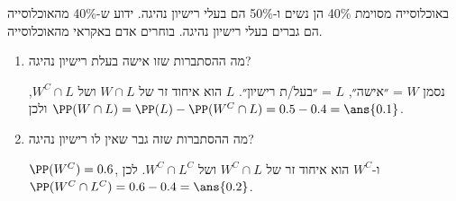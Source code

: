 באוכלוסייה מסוימת 40\% הן נשים ו-50\% הם בעלי רישיון נהיגה. ידוע ש-40\% מהאוכלוסייה הם גברים בעלי רישיון נהיגה. בוחרים אדם באקראי מהאוכלוסייה.
\begin{enumerate}
\item מה ההסתברות שזו אישה בעלת רישיון נהיגה?
\begin{solbox}
נסמן $W$ = ״אישה״, $L$ = ״בעל/ת רישיון״. $L$ הוא איחוד זר של $W\cap L$ ושל $W^C\cap L$, ולכן $\PP(W\cap L)=\PP(L)-\PP(W^C\cap L)=0.5-0.4=\ans{0.1}$.
\end{solbox}
\item מה ההסתברות שזה גבר שאין לו רישיון נהיגה?
\begin{solbox}
$\PP(W^C)=0.6$, ו-$W^C$ הוא איחוד זר של $W^C\cap L$ ושל $W^C\cap L^C$. לכן $\PP(W^C\cap L^C)=0.6-0.4=\ans{0.2}$.
\end{solbox}
\end{enumerate}
